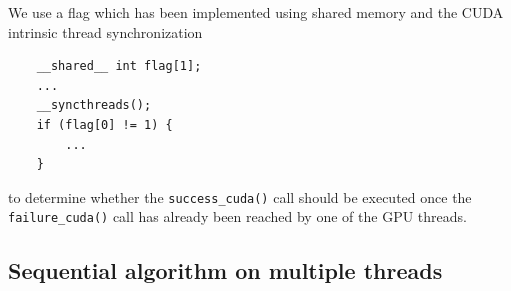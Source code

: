 \documentclass{article}
\begin{document}
We use a flag which has been implemented using shared memory and the CUDA intrinsic thread synchronization 
\begin{mdframed}[backgroundcolor=light-gray, roundcorner=10pt,leftmargin=0.5, rightmargin=0.5, innertopmargin=1,innerbottommargin=1, outerlinewidth=1, linecolor=light-gray]
\begin{lstlisting}
    __shared__ int flag[1];
    ...
    __syncthreads();
    if (flag[0] != 1) {
        ...
    }
\end{lstlisting}
\end{mdframed}
to determine whether the \texttt{success_cuda()} call should be executed once the \texttt{failure_cuda()} call has already been reached by one of the GPU threads.

\subsection{Sequential algorithm on multiple threads}
\end{document}
